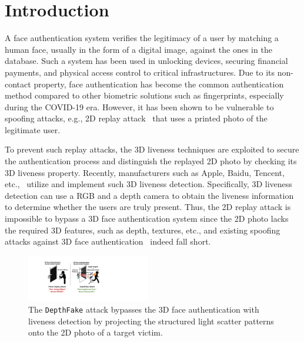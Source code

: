 \section{Introduction}
A face authentication system verifies the legitimacy of a user by matching a human face, usually in the form of a digital image, against the ones in the database. Such a system has been used in unlocking devices, securing financial payments, and physical access control to critical infrastructures. Due to its non-contact property, face authentication has become the common authentication method compared to other biometric solutions such as fingerprints, especially during the COVID-19 era. However, it has been shown to be vulnerable to spoofing attacks, e.g., 2D replay attack~\cite{chakka2011competition,anjos2011counter,raghavendra2015presentation} that uses a printed photo of the legitimate user.


To prevent such replay attacks, the 3D liveness techniques are exploited to secure the authentication process and distinguish the replayed 2D photo by checking its 3D liveness property. Recently, manufacturers such as Apple, Baidu, Tencent, etc.,~\cite{faceid, baidu, tencent} utilize and implement such 3D liveness detection. 
Specifically, 3D liveness detection can use a RGB and a depth camera to obtain the liveness information to determine whether the users are truly present. Thus, the 2D replay attack is impossible to bypass a 3D face authentication system since the 2D photo lacks the required 3D features, such as depth, textures, etc.,  and existing spoofing attacks against 3D face authentication~\cite{souza2018far, marcel2014handbook} indeed fall short.

\begin{figure}[t]
	\centerline{\includegraphics[width = 0.48\textwidth]{figures/intro.pdf}}
	\vspace{-0.1in}
	\caption{The \texttt{DepthFake} attack bypasses the 3D face authentication with liveness detection by projecting the structured light scatter patterns onto the 2D photo of a target victim.}
	\label{intro}
	\vspace{-0.2in}
\end{figure}

